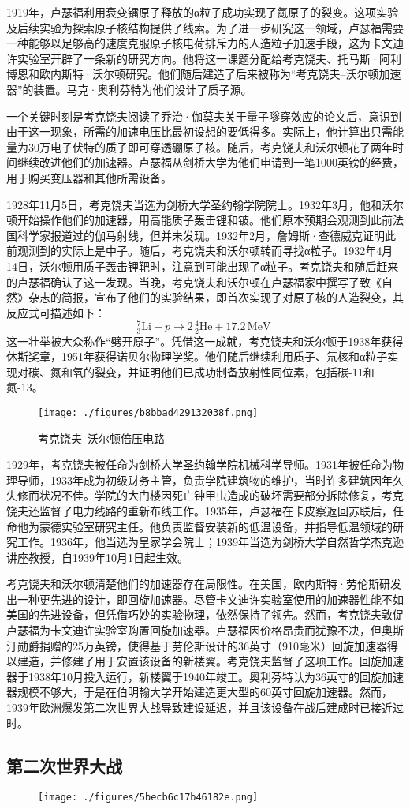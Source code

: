 1919年，卢瑟福利用衰变镭原子释放的α粒子成功实现了氮原子的裂变。这项实验及后续实验为探索原子核结构提供了线索。为了进一步研究这一领域，卢瑟福需要一种能够以足够高的速度克服原子核电荷排斥力的人造粒子加速手段，这为卡文迪许实验室开辟了一条新的研究方向。他将这一课题分配给考克饶夫、托马斯·阿利博恩和欧内斯特·沃尔顿研究。他们随后建造了后来被称为“考克饶夫–沃尔顿加速器”的装置。马克·奥利芬特为他们设计了质子源。

一个关键时刻是考克饶夫阅读了乔治·伽莫夫关于量子隧穿效应的论文后，意识到由于这一现象，所需的加速电压比最初设想的要低得多。实际上，他计算出只需能量为30万电子伏特的质子即可穿透硼原子核。随后，考克饶夫和沃尔顿花了两年时间继续改进他们的加速器。卢瑟福从剑桥大学为他们申请到一笔1000英镑的经费，用于购买变压器和其他所需设备。

1928年11月5日，考克饶夫当选为剑桥大学圣约翰学院院士。1932年3月，他和沃尔顿开始操作他们的加速器，用高能质子轰击锂和铍。他们原本预期会观测到此前法国科学家报道过的伽马射线，但并未发现。1932年2月，詹姆斯·查德威克证明此前观测到的实际上是中子。随后，考克饶夫和沃尔顿转而寻找α粒子。1932年4月14日，沃尔顿用质子轰击锂靶时，注意到可能出现了α粒子。考克饶夫和随后赶来的卢瑟福确认了这一发现。当晚，考克饶夫和沃尔顿在卢瑟福家中撰写了致《自然》杂志的简报，宣布了他们的实验结果，即首次实现了对原子核的人造裂变，其反应式可描述如下：
$$
_3^7\text{Li} + p \rightarrow 2\,_2^4\text{He} + 17.2\,\text{MeV}~
$$
这一壮举被大众称作“劈开原子”。凭借这一成就，考克饶夫和沃尔顿于1938年获得休斯奖章，1951年获得诺贝尔物理学奖。他们随后继续利用质子、氘核和α粒子实现对碳、氮和氧的裂变，并证明他们已成功制备放射性同位素，包括碳-11和氮-13。
\begin{figure}[ht]
\centering
\texttt{[image: ./figures/b8bbad429132038f.png]}
\caption{考克饶夫–沃尔顿倍压电路} \label{fig_YHkrf_3}
\end{figure}
1929年，考克饶夫被任命为剑桥大学圣约翰学院机械科学导师。1931年被任命为物理导师，1933年成为初级财务主管，负责学院建筑物的维护，当时许多建筑因年久失修而状况不佳。学院的大门楼因死亡钟甲虫造成的破坏需要部分拆除修复，考克饶夫还监督了电力线路的重新布线工作。1935年，卢瑟福在卡皮察返回苏联后，任命他为蒙德实验室研究主任。他负责监督安装新的低温设备，并指导低温领域的研究工作。1936年，他当选为皇家学会院士；1939年当选为剑桥大学自然哲学杰克逊讲座教授，自1939年10月1日起生效。

考克饶夫和沃尔顿清楚他们的加速器存在局限性。在美国，欧内斯特·劳伦斯研发出一种更先进的设计，即回旋加速器。尽管卡文迪许实验室使用的加速器性能不如美国的先进设备，但凭借巧妙的实验物理，依然保持了领先。然而，考克饶夫敦促卢瑟福为卡文迪许实验室购置回旋加速器。卢瑟福因价格昂贵而犹豫不决，但奥斯汀勋爵捐赠的25万英镑，使得基于劳伦斯设计的36英寸（910毫米）回旋加速器得以建造，并修建了用于安置该设备的新楼翼。考克饶夫监督了这项工作。回旋加速器于1938年10月投入运行，新楼翼于1940年竣工。奥利芬特认为36英寸的回旋加速器规模不够大，于是在伯明翰大学开始建造更大型的60英寸回旋加速器。然而，1939年欧洲爆发第二次世界大战导致建设延迟，并且该设备在战后建成时已接近过时。
\subsection{第二次世界大战}
\begin{figure}[ht]
\centering
\texttt{[image: ./figures/5becb6c17b46182e.png]}
\caption{} \label{fig_YHkrf_4}
\end{figure}